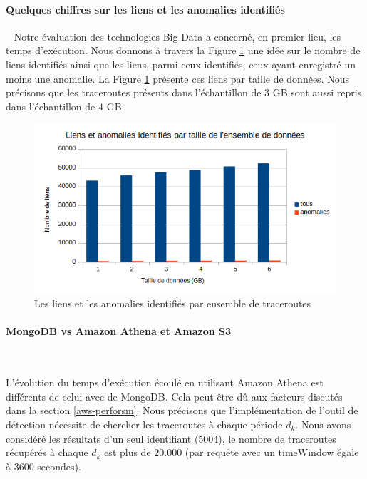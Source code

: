 \paragraph{Quelques chiffres sur les liens et les anomalies identifiés }~
Notre évaluation des technologies Big Data a concerné, en premier lieu, les temps d'exécution. Nous donnons à travers la Figure 	\ref{fig:tous-vs-anomalies-liens} une idée sur le nombre de liens identifiés ainsi que les liens, parmi ceux identifiés, ceux ayant enregistré un moins une anomalie. La Figure 	\ref{fig:tous-vs-anomalies-liens} présente ces liens par taille de données. Nous précisons que les traceroutes présents dans l'échantillon de $3$ GB sont aussi repris dans l'échantillon de $4$ GB. 
\begin{figure}[H]
	\centering
		\captionsetup{justification=centering}
	\includegraphics[width=0.7\linewidth]{illustrations/tous-vs-anomalies-liens}
	\caption{Les liens et les anomalies identifiés par ensemble de traceroutes}
	\label{fig:tous-vs-anomalies-liens}
\end{figure}



\paragraph{MongoDB vs Amazon Athena et Amazon S3}~

L'évolution du temps d'exécution écoulé en utilisant Amazon Athena est différents de celui avec de MongoDB. Cela peut être dû aux facteurs discutés dans la section \ref{aws-perforsm}. Nous précisons que l'implémentation de l'outil de détection nécessite de chercher les traceroutes à chaque période $d_k$. Nous avons considéré les résultats d'un seul identifiant (5004), le nombre de traceroutes récupérés à chaque $d_k$ est plus de $20.000$ (par requête avec un timeWindow égale à $3600$ secondes). 


